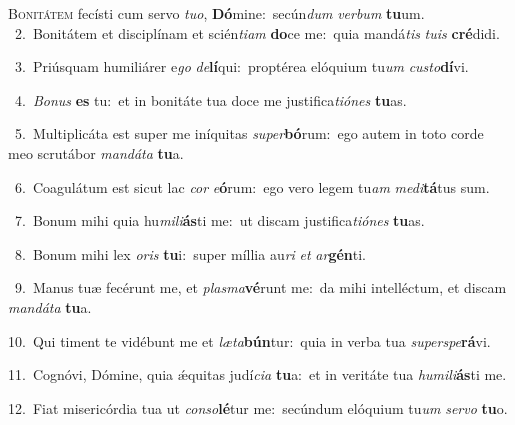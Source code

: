 \lettrine{\initial\textcolor{\initialcolor}{B}}{onitátem} fecísti cum servo \textit{tu}\-\textit{o}, \textbf{Dó}\-mine:~\star secún\textit{dum} \textit{ver}\-\textit{bum} \textbf{tu}\-um.\\
{\numbfont\textcolor{\numbcolor}{~2.}}~Bonitátem et disciplínam et scién\-\textit{ti}\-\textit{am} \textbf{do}\-ce me:~\star quia mandá\textit{tis} \textit{tu}\-\textit{is} \textbf{cré}\-didi.\par
{\numbfont\textcolor{\numbcolor}{~3.}}~Priúsquam humiliárer e\textit{go} \textit{de}\-\textbf{lí}qui:~\star proptérea elóquium tu\textit{um} \textit{cus}\-\textit{to}\textbf{dí}vi.\par
{\numbfont\textcolor{\numbcolor}{~4.}}~\-\textit{Bo}\-\textit{nus} \textbf{es} tu:~\star et in bonitáte tua doce me justifica\-\textit{ti}\-\textit{ó}\textit{nes} \textbf{tu}\-as.\par
{\numbfont\textcolor{\numbcolor}{~5.}}~Multiplicáta est super me iníquitas \textit{su}\-\textit{per}\textbf{bó}rum:~\star ego autem in toto corde meo scrutábor \textit{man}\-\textit{dá}\textit{ta} \textbf{tu}\-a.\par
{\numbfont\textcolor{\numbcolor}{~6.}}~Coagulátum est sicut lac \textit{cor} \textit{e}\-\textbf{ó}rum:~\star ego vero legem tu\textit{am} \textit{me}\-\textit{di}\textbf{tá}tus sum.\par
{\numbfont\textcolor{\numbcolor}{~7.}}~Bonum mihi quia hu\-\textit{mi}\-\textit{li}\textbf{ás}ti me:~\star ut discam justifica\-\textit{ti}\-\textit{ó}\textit{nes} \textbf{tu}\-as.\par
{\numbfont\textcolor{\numbcolor}{~8.}}~Bonum mihi lex \textit{o}\-\textit{ris} \textbf{tu}\-i:~\star super míllia au\textit{ri} \textit{et} \textit{ar}\-\textbf{gén}ti.\par
{\numbfont\textcolor{\numbcolor}{~9.}}~Manus tuæ fecérunt me, et \textit{plas}\-\textit{ma}\textbf{vé}runt me:~\star da mihi intelléctum, et discam \textit{man}\-\textit{dá}\textit{ta} \textbf{tu}\-a.\par
{\numbfont\textcolor{\numbcolor}{10.}}~Qui timent te vidébunt me et \textit{læ}\-\textit{ta}\textbf{bún}tur:~\star quia in verba tua \textit{su}\-\textit{per}\textit{spe}\textbf{rá}vi.\par
{\numbfont\textcolor{\numbcolor}{11.}}~Cognóvi, Dómine, quia ǽquitas judí\-\textit{ci}\-\textit{a} \textbf{tu}\-a:~\star et in veritáte tua \textit{hu}\-\textit{mi}\textit{li}\textbf{ás}ti me.\par
{\numbfont\textcolor{\numbcolor}{12.}}~Fiat misericórdia tua ut \textit{con}\-\textit{so}\textbf{lé}tur me:~\star secúndum elóquium tu\textit{um} \textit{ser}\-\textit{vo} \textbf{tu}\-o.\par
